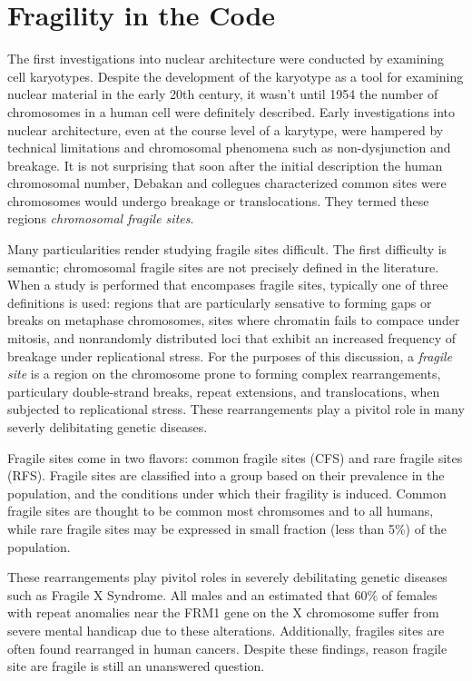 \documentclass[phd,tocprelim]{cornell}
\begin{document}
\chapter{Fragility in the Code}

The first investigations into nuclear architecture were conducted by
examining cell karyotypes.  Despite the development of the karyotype as a
tool for examining nuclear material in the early 20th
century\cite{levitsky1924}, it wasn't until 1954 the number of chromosomes in
a human cell were definitely described\cite{tjio1956}.  Early investigations
into nuclear architecture, even at the course level of a karytype, were
hampered by technical limitations and chromosomal phenomena such as
non-dysjunction and breakage.  It is not surprising that soon after the
initial description the human chromosomal number, Debakan and collegues
characterized common sites were chromosomes would undergo breakage or
translocations.  They termed these regions
\textit{chromosomal fragile sites}\cite{leyden2008}.

Many particularities render studying fragile sites difficult.  The
first difficulty is semantic; chromosomal fragile sites are not precisely
defined in the literature.  When a study is performed that encompases fragile
sites, typically one of three definitions is used: regions that are particularly
sensative to forming gaps or breaks on metaphase chromosomes\cite{glover2005},
sites where chromatin fails to compace under mitosis\cite{leyden2008}, and
nonrandomly distributed loci that exhibit an increased frequency of breakage
under replicational stress\cite{franchitto2013}.  For the purposes of this
discussion, a \textit{fragile site} is a region on the chromosome prone to
forming complex rearrangements, particulary double-strand breaks, repeat
extensions, and translocations, when subjected to replicational stress.  These
rearrangements play a pivitol role in many severly delibitating genetic
diseases.

Fragile sites come in two flavors: common fragile sites (CFS) and rare fragile
sites (RFS).  Fragile sites are classified into a group based on their
prevalence in the population, and the conditions under which their fragility
is induced\cite{leyden2008}.  Common fragile sites are thought to be common
most chromsomes and to all humans, while rare fragile sites may be expressed
in small fraction (less than 5\%) of the population\cite{wells2006}.

These
rearrangements play pivitol roles in severely debilitating genetic diseases
such as Fragile X Syndrome.  All males and an estimated that 60\% of females
with repeat anomalies near the FRM1 gene on the X chromosome suffer
from severe mental handicap due to these alterations\cite{sutherland1995}.
Additionally, fragiles sites are often found rearranged in human
cancers\cite{glover2005}.  Despite these findings, reason fragile site are
fragile is still an unanswered question.
\end{document}
